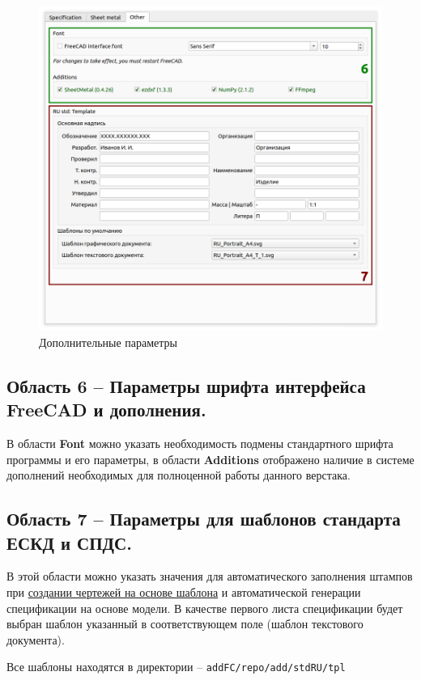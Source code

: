 \documentclass[a4paper,12pt]{article}
\begin{document}
\begin{figure}[htp]
	\centering
	\includegraphics[width=1\textwidth]{img/pref_other.png}
	\caption{Дополнительные параметры}
	\label{sec:pref_other}
\end{figure}

\subsection{Область 6 -- Параметры шрифта интерфейса FreeCAD и дополнения.}
В области \textbf{Font} можно указать необходимость подмены стандартного шрифта программы и его параметры, в области \textbf{Additions} отображено наличие в системе дополнений необходимых для полноценной работы данного верстака.

\subsection{Область 7 -- Параметры для шаблонов стандарта ЕСКД и СПДС.}
В этой области можно указать значения для автоматического заполнения штампов при \hyperref[sec:8]{создании чертежей на основе шаблона} и автоматической генерации спецификации на основе модели. В качестве первого листа спецификации будет выбран шаблон указанный в соответствующем поле (шаблон текстового документа).

Все шаблоны находятся в директории -- \verb|addFC/repo/add/stdRU/tpl|
\end{document}
